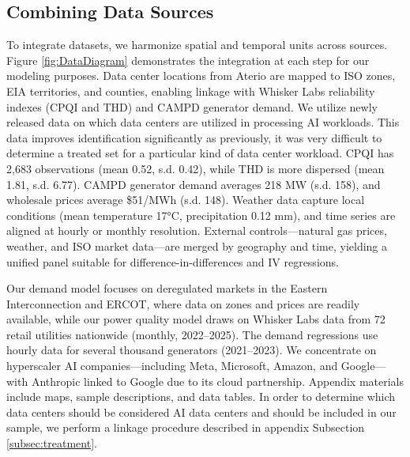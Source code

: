 \documentclass[a4paper,fleqn,longmktitle]{cas-sc}
\begin{document}
\subsection{Combining Data Sources}

To integrate datasets, we harmonize spatial and temporal units across sources. Figure \ref{fig:DataDiagram} demonstrates the integration at each step for our modeling purposes. Data center locations from Aterio are mapped to ISO zones, EIA territories, and counties, enabling linkage with Whisker Labs reliability indexes (CPQI and THD) and CAMPD generator demand. We utilize newly released data on which data centers are utilized in processing AI workloads. This data improves identification significantly as previously, it was very difficult to determine a treated set for a particular kind of data center workload. CPQI has 2,683 observations (mean 0.52, s.d. 0.42), while THD is more dispersed (mean 1.81, s.d. 6.77). CAMPD generator demand averages 218 MW (s.d. 158), and wholesale prices average \$51/MWh (s.d. 148). Weather data capture local conditions (mean temperature 17°C, precipitation 0.12 mm), and time series are aligned at hourly or monthly resolution. External controls—natural gas prices, weather, and ISO market data—are merged by geography and time, yielding a unified panel suitable for difference-in-differences and IV regressions.

Our demand model focuses on deregulated markets in the Eastern Interconnection and ERCOT, where data on zones and prices are readily available, while our power quality model draws on Whisker Labs data from 72 retail utilities nationwide (monthly, 2022–2025). The demand regressions use hourly data for several thousand generators (2021–2023). We concentrate on hyperscaler AI companies—including Meta, Microsoft, Amazon, and Google—with Anthropic linked to Google due to its cloud partnership. Appendix materials include maps, sample descriptions, and data tables. In order to determine which data centers should be considered AI data centers and should be included in our sample, we perform a linkage procedure described in appendix Subsection \ref{subsec:treatment}.
\end{document}
